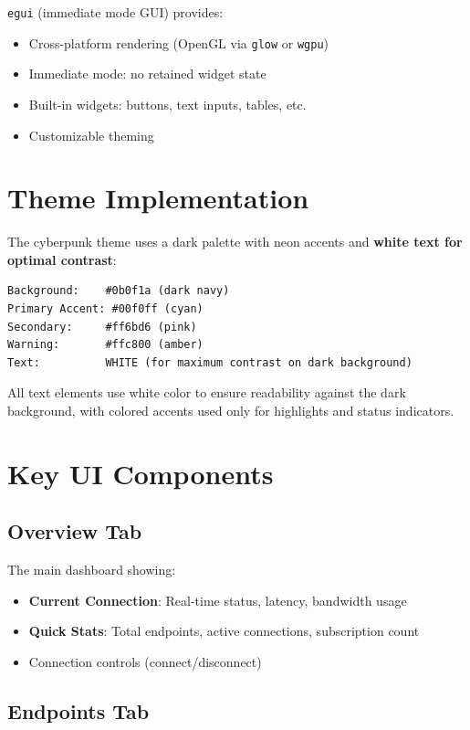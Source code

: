 \texttt{egui} (immediate mode GUI) provides:

\begin{itemize}
    \item Cross-platform rendering (OpenGL via \texttt{glow} or \texttt{wgpu})
    \item Immediate mode: no retained widget state
    \item Built-in widgets: buttons, text inputs, tables, etc.
    \item Customizable theming
\end{itemize}

\section{Theme Implementation}

The cyberpunk theme uses a dark palette with neon accents and \textbf{white text for optimal contrast}:

\begin{verbatim}
Background:    #0b0f1a (dark navy)
Primary Accent: #00f0ff (cyan)
Secondary:     #ff6bd6 (pink)
Warning:       #ffc800 (amber)
Text:          WHITE (for maximum contrast on dark background)
\end{verbatim}

All text elements use white color to ensure readability against the dark background, with colored accents used only for highlights and status indicators.

\section{Key UI Components}

\subsection{Overview Tab}

The main dashboard showing:
\begin{itemize}
    \item \textbf{Current Connection}: Real-time status, latency, bandwidth usage
    \item \textbf{Quick Stats}: Total endpoints, active connections, subscription count
    \item Connection controls (connect/disconnect)
\end{itemize}

\subsection{Endpoints Tab}

